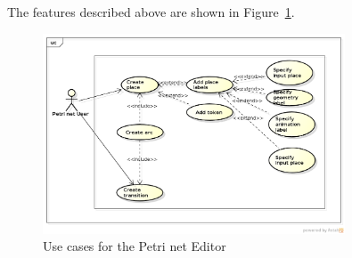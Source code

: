 The features described above are shown in Figure~\ref{fig:use-cases-petri-net-editor}.

\begin{figure}[htp]
\begin{center}
  \includegraphics[width=0.8\textwidth]{image/uc-petri-net.png}
  \caption{Use cases for the Petri net Editor}
  \label{fig:use-cases-petri-net-editor}
\end{center}
\end{figure}